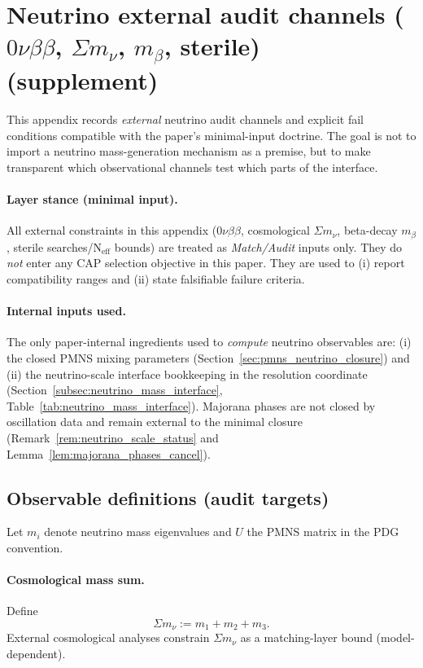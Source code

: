 \section{Neutrino external audit channels (\texorpdfstring{$0\nu\beta\beta$}{0nubb}, \texorpdfstring{$\Sigma m_\nu$}{Sigma m_nu}, \texorpdfstring{$m_\beta$}{m_beta}, sterile) (supplement)}
\label{app:neutrino_external_audit_channels}

This appendix records \emph{external} neutrino audit channels and explicit fail conditions
compatible with the paper's minimal-input doctrine.
The goal is not to import a neutrino mass-generation mechanism as a premise,
but to make transparent which observational channels test which parts of the interface.

\paragraph{Layer stance (minimal input).}
\MatchTag All external constraints in this appendix (0$\nu\beta\beta$, cosmological $\Sigma m_\nu$,
beta-decay $m_\beta$, sterile searches/N$_\mathrm{eff}$ bounds) are treated as \emph{Match/Audit} inputs only.
They do \emph{not} enter any CAP selection objective in this paper.
They are used to (i) report compatibility ranges and (ii) state falsifiable failure criteria.

\paragraph{Internal inputs used.}
The only paper-internal ingredients used to \emph{compute} neutrino observables are:
(i) the closed PMNS mixing parameters (Section~\ref{sec:pmns_neutrino_closure}) and
(ii) the neutrino-scale interface bookkeeping in the resolution coordinate
(Section~\ref{subsec:neutrino_mass_interface}, Table~\ref{tab:neutrino_mass_interface}).
Majorana phases are not closed by oscillation data and remain external to the minimal closure
(Remark~\ref{rem:neutrino_scale_status} and Lemma~\ref{lem:majorana_phases_cancel}).

\subsection{Observable definitions (audit targets)}
\label{subsec:neutrino_external_observables}

Let $m_i$ denote neutrino mass eigenvalues and $U$ the PMNS matrix in the PDG convention.

\paragraph{Cosmological mass sum.}
Define
\begin{equation}\label{eq:sigma_mnu_def}
\Sigma m_\nu := m_1+m_2+m_3.
\end{equation}
External cosmological analyses constrain $\Sigma m_\nu$ as a matching-layer bound (model-dependent).

